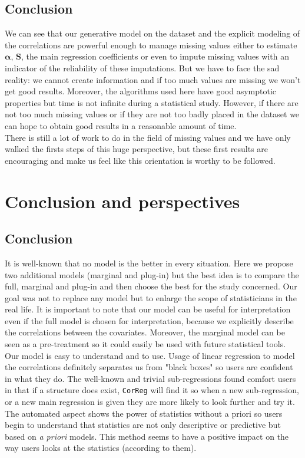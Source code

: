 \documentclass[12pt,a4paper]{report}
\begin{document}
\FloatBarrier	
\section{Conclusion}	We can see that our generative model on the dataset and the explicit modeling of the correlations are powerful enough to manage missing values either to estimate $\boldsymbol{\alpha}$, $\boldsymbol{S}$, the main regression coefficients or even to impute missing values with an indicator of the reliability of these imputations. But we have to face the sad reality: we cannot create information and if too much values are missing we won't get good results. Moreover, the algorithms used here have good asymptotic properties but time is not infinite during a statistical study. However, if there are not too much missing values or if they are not too badly placed in the dataset we can hope to obtain good results in a reasonable amount of time.\\
There is still a lot of work to do in the field of missing values and we have only walked the firsts steps of this huge perspective, but these first results are encouraging and make us feel like this orientation is worthy to be followed.


\chapter{Conclusion and perspectives}
	\section{Conclusion}
		It is well-known that no model is the better in every situation. Here we propose two additional models (marginal and plug-in) but the best idea is to compare the full, marginal and plug-in and then choose the best for the study concerned. Our goal was not to replace any model but to enlarge the scope of statisticians in the real life. It is important to note that our model can be useful for interpretation even if the full model is chosen for interpretation, because we explicitly describe the correlations between the covariates. Moreover, the marginal model can be seen as a pre-treatment so it could easily be used with future statistical tools. \\
		
		Our model is easy to understand and to use. Usage of linear regression to model the correlations definitely separates us from "black boxes" so users are confident in what they do. The well-known and trivial sub-regressions found comfort users in that if a structure does exist, {\tt CorReg} will find it so when a new sub-regression, or a new main regression is given they are more likely to look further and try it. The automated aspect shows the power of statistics without a priori so users begin to understand that statistics are not only descriptive or predictive but based on {\it a priori} models. This method seems to have a positive impact on the way users looks at the statistics (according to them). \\
		
\end{document}
